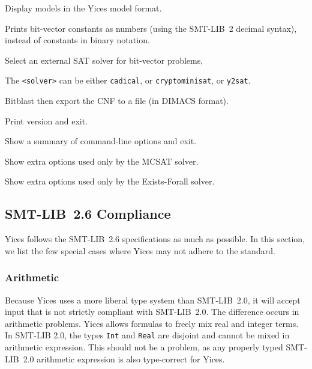 \documentclass[11pt,twoside,fleqn,openright,titlepage]{cslreport}
\newenvironment{options}{
\begin{list}{}{
\setlength{\labelsep}{1.8ex}
\setlength{\labelwidth}{0pt}
\setlength{\itemindent}{-0.5\leftmargin}
\settowidth{\leftmargin}{\texttt{--}}
\renewcommand{\makelabel}{\optionlabel}}}
{\end{list}}
\newcommand*\optionlabel[1]{\hspace\labelsep\texttt{#1}}
\begin{document}
\begin{options}
\item[--yices-model-format] Display models in the Yices model format.

\item[--bvconst-in-decimal] Prints bit-vector constants as numbers
  (using the SMT-LIB~2 decimal syntax), instead of constants in binary
  notation.

\item[--delegate=<solver>] Select an external SAT solver for bit-vector problems,

   The \texttt{<solver>} can be either \texttt{cadical}, or \texttt{cryptominisat}, or \texttt{y2sat}.

\item[--dimacs=<filename>] Bitblast then export the CNF to a file (in DIMACS format).

\item[--version, -V] Print version and exit.

\item[--help, -h] Show a summary of command-line options and exit.

\item[--mcsat-help] Show extra options used only by the MCSAT solver.

\item[--ef-help] Show extra options used only by the Exists-Forall solver.

\end{options}


\subsection{SMT-LIB~2.6 Compliance}

Yices follows the SMT-LIB~2.6 specifications as much as possible. In
this section, we list the few special cases where Yices may not adhere
to the standard.

\subsubsection*{Arithmetic}

Because Yices uses a more liberal type system than SMT-LIB~2.0, it
will accept input that is not strictly compliant with SMT-LIB~2.0. The
difference occurs in arithmetic problems. Yices allows formulas to
freely mix real and integer terms. In SMT-LIB 2.0, the types
\texttt{Int} and \texttt{Real} are disjoint and cannot be mixed in
arithmetic expression. This should not be a problem, as any properly
typed SMT-LIB~2.0 arithmetic expression is also type-correct for
Yices.
\end{document}
